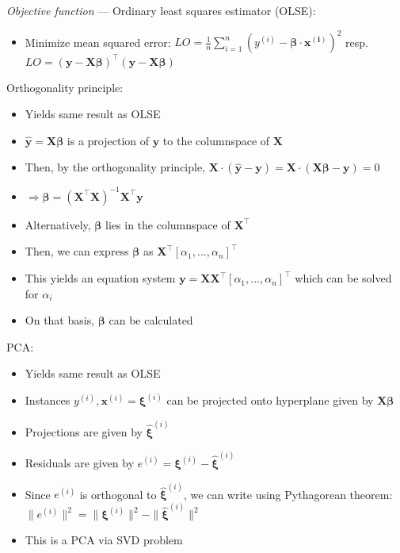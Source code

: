 \emph{Objective function} --- 
Ordinary least squares estimator (OLSE):
\begin{itemize}
    \item Minimize mean squared error: $LO = \frac{1}{n} \sum_{i=1}^n ( y^{(i)} - \boldsymbol{\beta} \cdot \boldsymbol{x^{(i)}} )^2$ resp. $LO = ( \boldsymbol{y} - \boldsymbol{X}\boldsymbol{\beta})^\intercal( \boldsymbol{y} - \boldsymbol{X}\boldsymbol{\beta} )$
\end{itemize}
Orthogonality principle:
\begin{itemize}
    \item Yields same result as OLSE
    \item $\hat{\boldsymbol{y}} = \boldsymbol{X}\boldsymbol{\beta}$ is a projection of $\boldsymbol{y}$ to the columnspace of $\boldsymbol{X}$
    \item Then, by the orthogonality principle, $\boldsymbol{X} \cdot (\hat{\boldsymbol{y}} - \boldsymbol{y}) = \boldsymbol{X} \cdot (\boldsymbol{X}\boldsymbol{\beta} - \boldsymbol{y}) = 0$
    \item $\Rightarrow \boldsymbol{\beta} = (\boldsymbol{X}^\intercal \boldsymbol{X})^{-1}  \boldsymbol{X}^\intercal \boldsymbol{y}$
    \item Alternatively, $\boldsymbol{\beta}$ lies in the columnspace of $\boldsymbol{X}^\intercal$
    \item Then, we can express $\boldsymbol{\beta}$ as $\boldsymbol{X}^\intercal [\alpha_1, ..., \alpha_n]^\intercal$
    \item This yields an equation system $\boldsymbol{y} = \boldsymbol{X} \boldsymbol{X}^\intercal [\alpha_1, ..., \alpha_n]^\intercal$ which can be solved for $\alpha_i$
    \item On that basis, $\boldsymbol{\beta}$ can be calculated
\end{itemize}
PCA:
\begin{itemize}
    \item Yields same result as OLSE
    \item Instances $y^{(i)}, \boldsymbol{x}^{(i)} = \boldsymbol{\xi}^{(i)}$ can be projected onto hyperplane given by $\boldsymbol{X}\boldsymbol{\beta}$
    \item Projections are given by $\hat{\boldsymbol{\xi}}^{(i)}$
    \item Residuals are given by $e^{(i)} = \boldsymbol{\xi}^{(i)} - \hat{\boldsymbol{\xi}}^{(i)}$
    \item Since $e^{(i)}$ is orthogonal to $\hat{\boldsymbol{\xi}}^{(i)}$, we can write using Pythagorean theorem: $\| e^{(i)} \|^2 = \| \boldsymbol{\xi}^{(i)} \|^2 - \| \hat{\boldsymbol{\xi}}^{(i)} \|^2$
    \item This is a PCA via SVD problem
\end{itemize}

